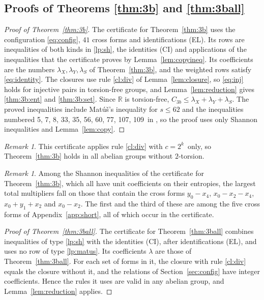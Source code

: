 \documentclass[11pt]{amsart}
\theoremstyle{definition}
\theoremstyle{remark}
\newtheorem{remark}[theorem]{Remark}
\numberwithin{equation}{section}
\newcommand{\R}{\mathbb{R}}
\newcommand{\CbFormsUsed}{41}
\newcommand{\CbLemMatusMax}{62}
\newcommand{\CbLemDFZ}{5, 7, 8, 33, 35, 56, 60, 77, 107, 109}
\newcommand{\CbDomain}{groups without $2$-torsion}
\newcommand{\CbDiv}{$c=2^k$}
\begin{document}
\subsection{Proofs of Theorems \ref{thm:3b} and \ref{thm:3ball}}

\begin{proof}[Proof of Theorem~\ref{thm:3b}]
The certificate for Theorem~\ref{thm:3b} \cite{Cert} uses the configuration \eqref{eq:config}, $\CbFormsUsed$ cross forms and identifications (EL). Its rows are inequalities of both kinds in \ref{lp:sh}, the identities (CI) and applications of the inequalities that the certificate proves by Lemma~\ref{lem:copyineq}. Its coefficients are the numbers $\lambda_X,\lambda_Y,\lambda_S$ of Theorem~\ref{thm:3b}, and the weighted rows satisfy \eqref{eq:identity}. The closures use rule \ref{cl:div} of Lemma~\ref{lem:closure}, so \eqref{eq:inj} holds for injective pairs in torsion-free groups, and Lemma~\ref{lem:reduction} gives \ref{thm:3b:ent} and \ref{thm:3b:set}. Since $\R$ is torsion-free, $C_{3b}\le\lambda_X+\lambda_Y+\lambda_S$. The proved inequalities include Mat\'u\v{s}'s inequality for $s\le\CbLemMatusMax$ and the inequalities numbered \CbLemDFZ\ in \cite[Section~VIII]{DFZ11}, so the proof uses only Shannon inequalities and Lemma~\ref{lem:copy}.\end{proof}

\begin{remark}\label{rem:s30}
This certificate applies rule \ref{cl:div} with \CbDiv\ only, so Theorem~\ref{thm:3b} holds in all abelian \CbDomain. \end{remark}

\begin{remark}\label{rem:weight}
Among the Shannon inequalities of the certificate for Theorem~\ref{thm:3b}, which all have unit coefficients on their entropies, the largest total multipliers fall on those that contain the cross forms $y_0-x_4$, $x_0-x_2-x_4$, $x_0+y_1+x_2$ and $x_0-x_2$. The first and the third of these are among the five cross forms of Appendix~\ref{app:short}, all of which occur in the certificate.
\end{remark}

\begin{proof}[Proof of Theorem~\ref{thm:3ball}]
The certificate for Theorem~\ref{thm:3ball} \cite{Cert} combines inequalities of type \ref{lp:sh} with the identities (CI), after identifications (EL), and uses no row of type \ref{lp:matus}. Its coefficients $\lambda$ are those of Theorem~\ref{thm:3ball}. For each set of forms in it, the closure with rule \ref{cl:div} equals the closure without it, and the relations of Section~\ref{sec:config} have integer coefficients. Hence the rules it uses are valid in any abelian group, and Lemma~\ref{lem:reduction} applies.
\end{proof}
\end{document}
